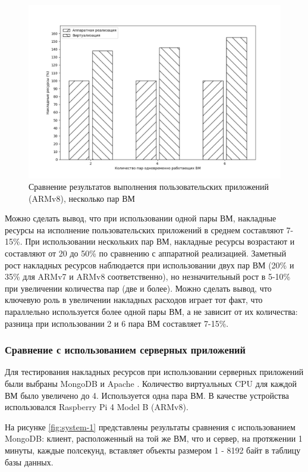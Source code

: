 \begin{figure}[h]
	\centering
	\includegraphics[width=\textwidth]{img/user-2-armv8.pdf}
	\caption{Сравнение результатов выполнения пользовательских приложений (ARMv8), несколько пар ВМ}
	\label{fig:perf-user-2-armv8}
\end{figure}

Можно сделать вывод, что при использовании одной пары ВМ, накладные ресурсы на исполнение пользовательских приложений в среднем составляют 7-15\%. При использовании нескольких пар ВМ, накладные ресурсы возрастают и составляют от 20 до 50\% по сравнению с аппаратной реализацией. Заметный рост накладных ресурсов наблюдается при использовании двух пар ВМ (20\% и 35\% для ARMv7 и ARMv8 соответственно), но незначительный рост в 5-10\% при увеличении количества пар (две и более). Можно сделать вывод, что ключевую роль в увеличении накладных расходов играет тот факт, что параллельно используется более одной пары ВМ, а не зависит от их количества: разница при использовании 2 и 6 пара ВМ составляет 7-15\%.

\subsubsection{Сравнение с использованием серверных приложений}

Для тестирования накладных ресурсов при использовании серверных приложений были выбраны MongoDB \cite{mongodb} и Apache \cite{apache}. Количество виртуальных CPU для каждой ВМ было увеличено до 4. Используется одна пара ВМ. В качестве устройства использовался Raspberry Pi 4 Model B (ARMv8).

На рисунке \ref{fig:system-1} представлены результаты сравнения с использованием\\MongoDB: клиент, расположенный на той же ВМ, что и сервер, на протяжении 1 минуты, каждые полсекунд, вставляет объекты размером 1 - 8192 байт в таблицу базы данных. 

